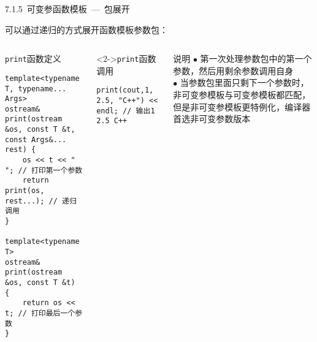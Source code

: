 \begin{frame}[fragile]{7.1.5~可变参函数模板\normalsize{~---~包展开}}

可以通过\alert{递归}的方式展开函数模板参数包：

\vspace{-4mm}

\begin{columns}[t]

\begin{blueblock}{\texttt{print}函数定义}
\vspace{-2mm}\begin{lstlisting}[moreemph={T}]
template<typename T, typename... Args>
ostream& print(ostream &os, const T &t, const Args&... rest) {
    os << t << " "; // 打印第一个参数
    return print(os, rest...); // 递归调用
}

template<typename T>
ostream& print(ostream &os, const T &t) {
    return os << t; // 打印最后一个参数
}
\end{lstlisting}\vspace{-2mm}
\end{blueblock}
\begin{blueblock}<2->{\texttt{print}函数调用}
\vspace{-1.5mm}\begin{lstlisting}[moreemph={T}]
print(cout,1, 2.5, "C++") << endl; // 输出1 2.5 C++
\end{lstlisting}\vspace{-1.5mm}
\end{blueblock}

\begin{yellowblock}{说明}
$\bullet$ 第一次处理参数包中的第一个参数，然后用剩余参数调用自身\\
$\bullet$ 当参数包里面只剩下一个参数时，非可变参模板与可变参模板都匹配，但是非可变参模板更特例化，编译器首选非可变参数版本
\end{yellowblock}

\end{columns}

\end{frame}


